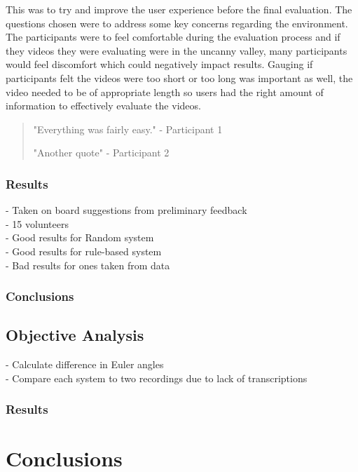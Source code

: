 \documentclass[bsc,frontabs,twoside,singlespacing,parskip]{infthesis}
\begin{document}
This was to try and improve the user experience before the final evaluation. The questions chosen were to address some key concerns regarding the environment. The participants were to feel comfortable during the evaluation process and if they videos they were evaluating were in the uncanny valley, many participants would feel discomfort which could negatively impact results. Gauging if participants felt the videos were too short or too long was important as well, the video needed to be of appropriate length so users had the right amount of information to effectively evaluate the videos.

\begin{quotation}
"Everything was fairly easy." - Participant 1

"Another quote" - Participant 2
\end{quotation}

\subsection{Results}

- Taken on  board suggestions from preliminary feedback \\
- 15 volunteers \\
- Good results for Random system \\
- Good results for rule-based system \\
- Bad results for ones taken from data \\

\subsection{Conclusions}

\section{Objective Analysis}

- Calculate difference in Euler angles\\
- Compare each system to two recordings due to lack of transcriptions\\

\subsection{Results}
\chapter{Conclusions}
\end{document}
